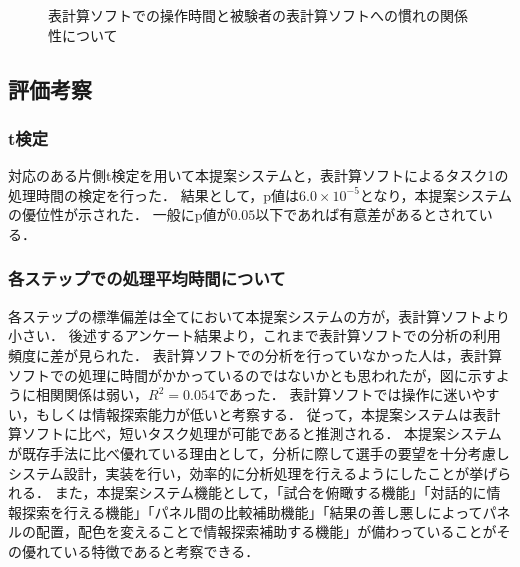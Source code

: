 \documentclass[sotsuron]{kuee}
\begin{document}
			\begin{figure}
				\begin{center}
				\end{center}
				\caption{表計算ソフトでの操作時間と被験者の表計算ソフトへの慣れの関係性について}
		  		\label{fig:result05}
			\end{figure}
		\subsection{評価考察}
			\subsubsection{t検定}
				対応のある片側t検定を用いて本提案システムと，表計算ソフトによるタスク1の処理時間の検定を行った．
				結果として，p値は$6.0 \times 10^{-5}$となり，本提案システムの優位性が示された．
				一般にp値が$0.05$以下であれば有意差があるとされている．
			\subsubsection{各ステップでの処理平均時間について}
				各ステップの標準偏差は全てにおいて本提案システムの方が，表計算ソフトより小さい．
				後述するアンケート結果より，これまで表計算ソフトでの分析の利用頻度に差が見られた．
				表計算ソフトでの分析を行っていなかった人は，表計算ソフトでの処理に時間がかかっているのではないかとも思われたが，図に示すように相関関係は弱い，$R^2 = 0.054$であった．
				表計算ソフトでは操作に迷いやすい，もしくは情報探索能力が低いと考察する．
				従って，本提案システムは表計算ソフトに比べ，短いタスク処理が可能であると推測される．
				本提案システムが既存手法に比べ優れている理由として，分析に際して選手の要望を十分考慮しシステム設計，実装を行い，効率的に分析処理を行えるようにしたことが挙げられる．
				また，本提案システム機能として，「試合を俯瞰する機能」「対話的に情報探索を行える機能」「パネル間の比較補助機能」「結果の善し悪しによってパネルの配置，配色を変えることで情報探索補助する機能」が備わっていることがその優れている特徴であると考察できる．
\end{document}
